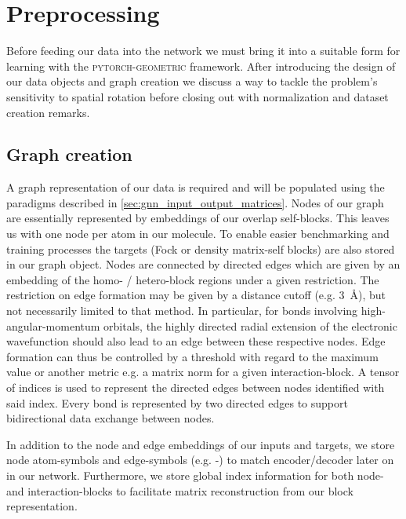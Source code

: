 \section{Preprocessing}
\label{sec:gnn_preproc}
Before feeding our data into the network we must bring it into a suitable form for learning with the \textsc{pytorch-geometric} framework. \parencite{ref:PyTorchGeometric, ref:PyTorch_geom_paper} After introducing the design of our data objects and graph creation we discuss a way to tackle the problem's sensitivity to spatial rotation before closing out with normalization and dataset creation remarks. 
\subsection{Graph creation}
\label{subsec:gnn_graph_creation}
A graph representation of our data is required and will be populated using the paradigms described in \autoref{sec:gnn_input_output_matrices}. Nodes of our graph are essentially represented by embeddings of our overlap self-blocks. This leaves us with one node per atom in our molecule. To enable easier benchmarking and training processes the targets (Fock or density matrix-self blocks) are also stored in our graph object. Nodes are connected by directed edges which are given by an embedding of the homo- / hetero-block regions under a given restriction. The restriction on edge formation may be given by a distance cutoff (e.g. \SI{3}{\angstrom}), but not necessarily limited to that method. In particular, for bonds involving high-angular-momentum orbitals, the highly directed radial extension of the electronic wavefunction should also lead to an edge between these respective nodes. Edge formation can thus be controlled by a threshold with regard to the maximum value or another metric e.g. a matrix norm for a given interaction-block. A tensor of indices is used to represent the directed edges between nodes identified with said index. Every bond is represented by two directed edges to support bidirectional data exchange between nodes.

In addition to the node and edge embeddings of our inputs and targets, we store node atom-symbols and edge-symbols (e.g. -) to match encoder/decoder later on in our network. Furthermore, we store global index information for both node- and interaction-blocks to facilitate matrix reconstruction from our block representation. 

